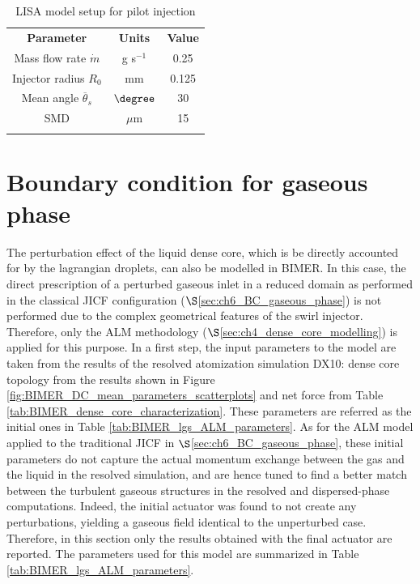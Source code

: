 

\begin{table}[!h]
\centering
\caption{LISA model setup for pilot injection}
\begin{tabular}{ccc}
\thickhline
\textbf{Parameter} & \textbf{Units} &  \textbf{Value} \\
\thickhline
Mass flow rate $\dot{m}$ & g s$^{-1}$ & 0.25 \\
Injector radius $R_0$ & mm & 0.125 \\
Mean angle $\overline{\theta}_s$ & $\degree$ & 30  \\
SMD & $\mu$m & 15 \\
\thickhline
\end{tabular}
\label{tab:LISA_model_parameters}
\end{table}



\section{Boundary condition for gaseous phase}
\label{sec:ch9_BIMER_BCs_for_gaseous_phase}

The perturbation effect of the liquid dense core, which is be directly accounted for by the lagrangian droplets, can also be modelled in BIMER. In this case, the direct prescription of a perturbed gaseous inlet in a reduced domain as performed in the classical JICF configuration ($\S$\ref{sec:ch6_BC_gaseous_phase}) is not performed due to the complex geometrical features of the swirl injector. Therefore, only the ALM methodology ($\S$\ref{sec:ch4_dense_core_modelling}) is applied for this purpose. In a first step, the input parameters to the model are taken from the results of the resolved atomization simulation DX10: dense core topology from the results shown in Figure \ref{fig:BIMER_DC_mean_parameters_scatterplots} and net force from Table \ref{tab:BIMER_dense_core_characterization}.  These parameters are referred as the initial ones in Table \ref{tab:BIMER_lgs_ALM_parameters}. As for the ALM model applied to the traditional JICF in $\S$\ref{sec:ch6_BC_gaseous_phase}, these initial parameters do not capture the actual momentum exchange between the gas and the liquid in the resolved simulation, and are hence tuned to find a better match between the turbulent gaseous structures in the resolved and dispersed-phase computations. Indeed, the initial actuator was found to not create any perturbations, yielding a gaseous field identical to the unperturbed case. Therefore, in this section only the results obtained with the final actuator are reported. The parameters used for this model are summarized in Table \ref{tab:BIMER_lgs_ALM_parameters}. 

